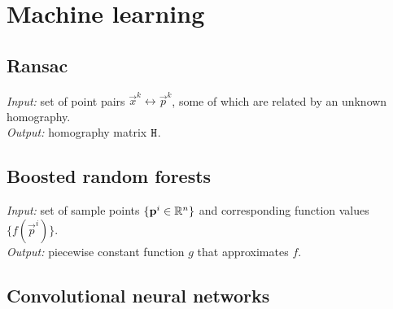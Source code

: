 
\section{Machine learning}

\subsection{Ransac}

\textit{Input:} set of point pairs $\vec x^k \leftrightarrow \vec p^k$, some of which are related by an unknown homography.\\
\textit{Output:} homography matrix $\mathtt{H}$.\\

\subsection{Boosted random forests}

\textit{Input:} set of sample points $\{\mathbf{p}^i \in \mathbb{R}^n \}$ and corresponding function values $\{ f(\vec p^i) \}$.\\
\textit{Output:} piecewise constant function $g$ that approximates $f$.\\

\subsection{Convolutional neural networks}
